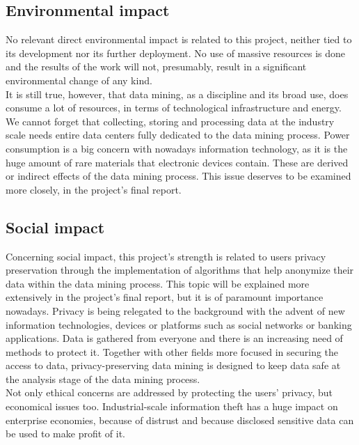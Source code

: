 \subsection{Environmental impact}

No relevant direct environmental impact is related to this project, neither tied to its development nor its further deployment. No use of massive resources is done and the results of the work will not, presumably, result in a significant environmental change of any kind.\\

It is still true, however, that data mining, as a discipline and its broad use, does consume a lot of resources, in terms of technological infrastructure and energy. We cannot forget that collecting, storing and processing data at the industry scale needs entire data centers fully dedicated to the data mining process. Power consumption is a big concern with nowadays information technology, as it is the huge amount of rare materials that electronic devices contain. These are derived or indirect effects of the data mining process. This issue deserves to be examined more closely, in the project’s final report.

\subsection{Social impact}

Concerning social impact, this project’s strength is related to users privacy preservation through the implementation of algorithms that help anonymize their data within the data mining process. This topic will be explained more extensively in the project’s final report, but it is of paramount importance nowadays. Privacy is being relegated to the background with the advent of new information technologies, devices or platforms such as social networks or banking applications. Data is gathered from everyone and there is an increasing need of methods to protect it. Together with other fields more focused in securing the access to data, privacy-preserving data mining is designed to keep data safe at the analysis stage of the data mining process.\\

Not only ethical concerns are addressed by protecting the users’ privacy, but economical issues too. Industrial-scale information theft has a huge impact on enterprise economies, because of distrust and because disclosed sensitive data can be used to make profit of it.
